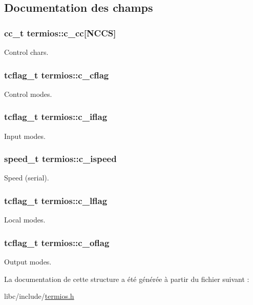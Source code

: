 \subsection{Documentation des champs}
\hypertarget{structtermios_a5fbe3e4316082afab45fc424938ef13a}{
\subsubsection[{c\-\_\-cc}]{\setlength{\rightskip}{0pt plus 5cm}cc\-\_\-t termios\-::c\-\_\-cc\mbox{[}N\-C\-C\-S\mbox{]}}}\label{structtermios_a5fbe3e4316082afab45fc424938ef13a}
Control chars. \hypertarget{structtermios_a5d42b95faa4745c3bea53652d2812162}{
\subsubsection[{c\-\_\-cflag}]{\setlength{\rightskip}{0pt plus 5cm}tcflag\-\_\-t termios\-::c\-\_\-cflag}}\label{structtermios_a5d42b95faa4745c3bea53652d2812162}
Control modes. \hypertarget{structtermios_a85b6c86d2a3db45a3829488190e357e4}{
\subsubsection[{c\-\_\-iflag}]{\setlength{\rightskip}{0pt plus 5cm}tcflag\-\_\-t termios\-::c\-\_\-iflag}}\label{structtermios_a85b6c86d2a3db45a3829488190e357e4}
Input modes. \hypertarget{structtermios_a02ae972cbc9fb2cf4a1aa6a6751a421a}{
\subsubsection[{c\-\_\-ispeed}]{\setlength{\rightskip}{0pt plus 5cm}speed\-\_\-t termios\-::c\-\_\-ispeed}}\label{structtermios_a02ae972cbc9fb2cf4a1aa6a6751a421a}
Speed (serial). \hypertarget{structtermios_a91bdd7691180800fccc4b791466ee9c3}{
\subsubsection[{c\-\_\-lflag}]{\setlength{\rightskip}{0pt plus 5cm}tcflag\-\_\-t termios\-::c\-\_\-lflag}}\label{structtermios_a91bdd7691180800fccc4b791466ee9c3}
Local modes. \hypertarget{structtermios_ad6e2cfedb81530e5a6a3a0e30b8c6362}{
\subsubsection[{c\-\_\-oflag}]{\setlength{\rightskip}{0pt plus 5cm}tcflag\-\_\-t termios\-::c\-\_\-oflag}}\label{structtermios_ad6e2cfedb81530e5a6a3a0e30b8c6362}
Output modes. 

La documentation de cette structure a été générée à partir du fichier suivant \-:\begin{DoxyCompactItemize}
\item 
libc/include/\hyperlink{termios_8h}{termios.\-h}\end{DoxyCompactItemize}
